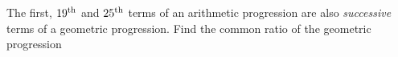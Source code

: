 
%
%
%
%      
% 
% 
%   



\gcalcexpr[0]
\gcalcexpr[0]
\gcalcexpr[0]\tr{\vbtwo - \vbone}

\question[3] The first, $19^\text{th}$ and $25^\text{th}$ terms of an arithmetic progression are also 
\textit{successive} terms of a geometric progression. Find the common ratio of the geometric progression


